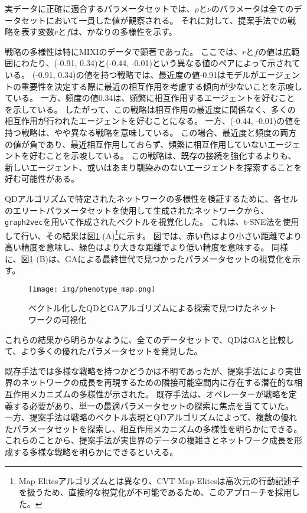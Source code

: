 \documentclass[uplatex,11pt,openany]{ujreport}
\begin{document}
            実データに正確に適合するパラメータセットでは、$\rho$と$\nu$のパラメータは全てのデータセットにおいて一貫した値が観察される。
            それに対して、提案手法での戦略を表す変数$r$と$f$は、かなりの多様性を示す。

            戦略の多様性は特にMIXIのデータで顕著であった。
            ここでは、$r$と$f$の値は広範囲にわたり、(-0.91, 0.34)と(-0.44, -0.01)という異なる値のペアによって示されている。
            (-0.91, 0.34)の値を持つ戦略では、最近度の値-0.91はモデルがエージェントの重要性を決定する際に最近の相互作用を考慮する傾向が少ないことを示唆している。
            一方、頻度の値0.34は、頻繁に相互作用するエージェントを好むことを示している。
            したがって、この戦略は相互作用の最近度に関係なく、多くの相互作用が行われたエージェントを好むことになる。
            一方、(-0.44, -0.01)の値を持つ戦略は、やや異なる戦略を意味している。
            この場合、最近度と頻度の両方の値が負であり、最近相互作用しておらず、頻繁に相互作用していないエージェントを好むことを示唆している。
            この戦略は、既存の接続を強化するよりも、新しいエージェント、或いはあまり馴染みのないエージェントを探索することを好む可能性がある。

            QDアルゴリズムで特定されたネットワークの多様性を検証するために、各セルのエリートパラメータセットを使用して生成されたネットワークから、\verb|graph2vec|を用いて作成されたベクトルを視覚化した。
            これは、t-SNE法\cite{t-SNE}を使用して行い、その結果は図\ref{fig:phenotype_map}-(A)\footnote{Map-Elitesアルゴリズムとは異なり、CVT-Map-Elitesは高次元の行動記述子を扱うため、直接的な視覚化が不可能であるため、このアプローチを採用した。}に示す。
            図では、赤い色はより小さい距離でより高い精度を意味し、緑色はより大きな距離でより低い精度を意味する。
            同様に、図\ref{fig:phenotype_map}-(B)は、GAによる最終世代で見つかったパラメータセットの視覚化を示す。
            \begin{figure}[htbp]
                \centering
                \texttt{[image: img/phenotype\_map.png]}
                \caption{ベクトル化したQDとGAアルゴリズムによる探索で見つけたネットワークの可視化}
                \label{fig:phenotype_map}
            \end{figure}
            これらの結果から明らかなように、全てのデータセットで、QDはGAと比較して、より多くの優れたパラメータセットを発見した。

            既存手法では多様な戦略を持つかどうかは不明であったが、提案手法により実世界のネットワークの成長を再現するための隣接可能空間内に存在する潜在的な相互作用メカニズムの多様性が示された。
            既存手法は、オペレーターが戦略を定義する必要があり、単一の最適パラメータセットの探索に焦点を当てていた。
            一方、提案手法は戦略のベクトル表現とQDアルゴリズムによって、複数の優れたパラメータセットを探索し、相互作用メカニズムの多様性を明らかにできる。
            これらのことから、提案手法が実世界のデータの複雑さとネットワーク成長を形成する多様な戦略を明らかにできるといえる。
\end{document}
